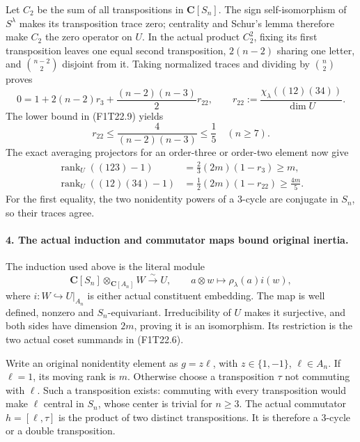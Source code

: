 Let \(C_2\) be the sum of all transpositions in
\(\mathbf C[S_n]\). The sign self-isomorphism of
\(S^\lambda\) makes its transposition trace zero;
centrality and Schur's lemma therefore make \(C_2\)
the zero operator on \(U\). In the actual product
\(C_2^2\), fixing its first transposition leaves one
equal second transposition, \(2(n-2)\) sharing one
letter, and \(\binom{n-2}{2}\) disjoint from it.
Taking normalized traces and dividing by \(\binom n2\)
proves
\[
 0=1+2(n-2)r_3+
       \frac{(n-2)(n-3)}2r_{22},
 \qquad
 r_{22}:=\frac{\chi_\lambda((12)(34))}{\dim U}.
 \tag{F1T22.10}
\]
The lower bound in (F1T22.9) yields
\[
 r_{22}\le\frac4{(n-2)(n-3)}\le\frac15
                  \quad(n\ge7).
 \tag{F1T22.11}
\]
The exact averaging projectors for an order-three or
order-two element now give
\[
 \begin{split}
 \operatorname{rank}_U((123)-1)
   &=\frac23(2m)(1-r_3)\ge m,\\
 \operatorname{rank}_U((12)(34)-1)
   &=\frac12(2m)(1-r_{22})\ge\frac{4m}{5}.
 \end{split}
 \tag{F1T22.12}
\]
For the first equality, the two nonidentity powers of a
3-cycle are conjugate in \(S_n\), so their traces agree.

\paragraph{4. The actual induction and commutator maps bound original inertia.}
The induction used above is the literal module
\[
 \mathbf C[S_n]\otimes_{\mathbf C[A_n]}W
       \xrightarrow{\sim}U,
       \qquad a\otimes w\longmapsto\rho_\lambda(a)i(w),
 \tag{F1T22.13}
\]
where \(i:W\hookrightarrow U|_{A_n}\) is either
actual constituent embedding. The map is well defined,
nonzero and \(S_n\)-equivariant. Irreducibility of
\(U\) makes it surjective, and both sides have
dimension \(2m\), proving it is an isomorphism.
Its restriction is the two actual coset summands in
(F1T22.6).

Write an original nonidentity element as \(g=z\ell\),
with \(z\in\{1,-1\}\), \(\ell\in A_n\).
If \(\ell=1\), its moving rank is \(m\).
Otherwise choose a transposition \(\tau\) not
commuting with \(\ell\). Such a transposition exists:
commuting with every transposition would make
\(\ell\) central in \(S_n\), whose center is trivial
for \(n\ge3\). The actual commutator
\(h=[\ell,\tau]\) is the product of two distinct
transpositions. It is therefore a 3-cycle or a double
transposition.

